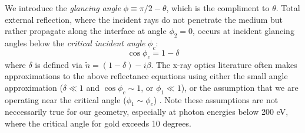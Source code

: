 %
%

We introduce the \textit{glancing angle} $\phi \equiv \pi/2 - \theta$, which is the compliment to $\theta$. Total external reflection, where the incident rays do not penetrate the medium but rather propagate along the interface at angle $\phi_2 = 0$, occurs at incident glancing angles below the \textit{critical incident angle} $\phi_c$:
\begin{equation}
\cos \phi_c = 1 - \delta
\end{equation}
where $\delta$ is defined via  $\tilde{n} = (1-\delta) - i \beta$. The x-ray optics literature often makes approximations to the above reflectance equations using either the small angle approximation ($\delta \ll 1$ and $\cos \phi_c \sim 1$, or $\phi_1 \ll 1$), or the assumption that we are operating near the critical angle ($\phi_1 \sim \phi_c$) \cite{attwoodSoftXraysExtreme2000}. Note these assumptions are not neccessarily true for our geometry, especially at photon energies below 200 eV, where the critical angle for gold exceeds 10 degrees.

